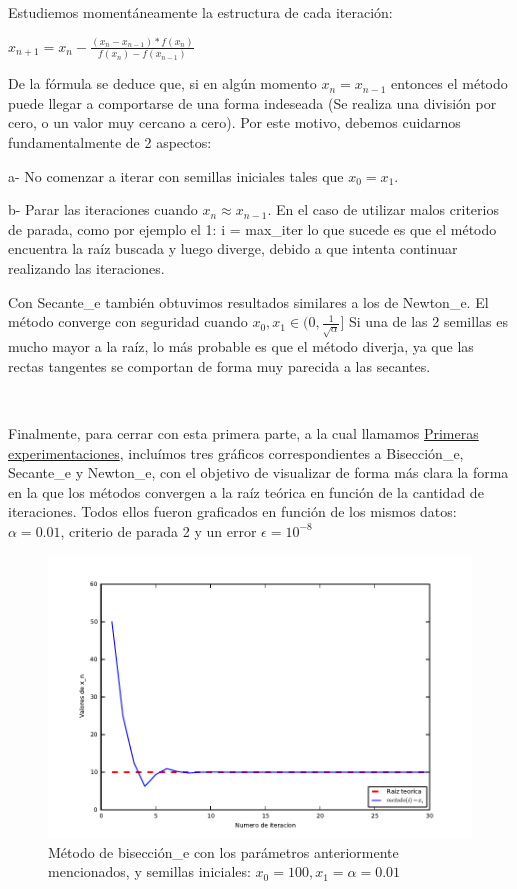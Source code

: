 Estudiemos momentáneamente la estructura de cada iteración:

$x_{n+1} = x_n - \frac{(x_n-x_{n-1})*f(x_n)}{f(x_n)-f(x_{n-1})}$

De la fórmula se deduce que, si en algún momento $x_n = x_{n-1}$ entonces el método puede llegar a comportarse de una forma indeseada (Se realiza una división por cero, o un valor muy cercano a cero).
Por este motivo, debemos cuidarnos fundamentalmente de 2 aspectos:

a- No comenzar a iterar con semillas iniciales tales que $x_0 = x_1$.

b- Parar las iteraciones cuando $x_n \approx x_{n-1}$. En el caso de utilizar malos criterios de parada, como por ejemplo el 1: i = max\_iter
lo que sucede es que el método encuentra la raíz buscada y luego diverge, debido a que intenta continuar realizando las iteraciones.

Con Secante\_e también obtuvimos resultados similares a los de Newton\_e. El método converge con seguridad cuando $x_0,x_1 \in (0,\frac{1}{\sqrt{\alpha}}]$ Si una de las 2 semillas es mucho mayor a la raíz, lo más
probable es que el método diverja, ya que las rectas tangentes se comportan de forma muy parecida a las secantes.

~

Finalmente, para cerrar con esta primera parte, a la cual llamamos \underline{Primeras experimentaciones}, incluímos tres gráficos correspondientes a Bisección\_e, Secante\_e y Newton\_e, con el objetivo de
visualizar de forma más clara la forma en la que los métodos convergen a la raíz teórica en función de la cantidad de iteraciones. Todos ellos fueron graficados en función de los mismos datos: $\alpha = 0.01$,
criterio de parada 2 y un error $\epsilon=10^{-8}$

\begin{figure}[!h]
	\begin{center}
		  \includegraphics[keepaspectratio]{../Imagenes/exp2/biseccion_e.pdf}
		  \caption{Método de bisección\_e con los parámetros anteriormente mencionados, y semillas iniciales: $x_0 = 100, x_1=\alpha=0.01$}
		  \label{fig:contra1}
	\end{center}
\end{figure}
\FloatBarrier

